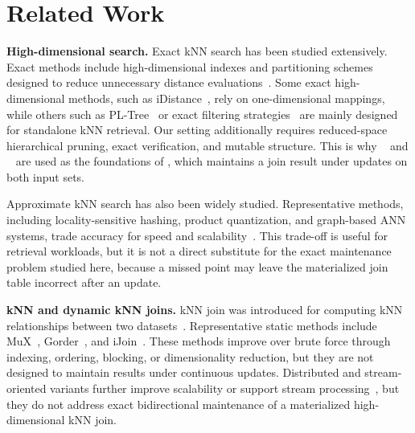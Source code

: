 \section{Related Work}\label{sec:related-works}

\noindent\textbf{High-dimensional search.}
Exact kNN search has been studied extensively. Exact methods include high-dimensional indexes and partitioning schemes designed to reduce unnecessary distance evaluations~\cite{yu2001indexing,cui2003contorting,cui2005indexing,garcia2010k,wang2013pl,xiao2016parallel,pan2020new,muhr2022hybrid}. Some exact high-dimensional methods, such as iDistance~\cite{jagadish2005idistance}, rely on one-dimensional mappings, while others such as PL-Tree~\cite{wang2013pl} or exact filtering strategies~\cite{pan2020new} are mainly designed for standalone kNN retrieval. Our setting additionally requires reduced-space hierarchical pruning, exact verification, and mutable structure. This is why \deltatree~\cite{cui2003contorting,cui2005indexing} and \hdrtree~\cite{yang2014continuous} are used as the foundations of \dualtree, which maintains a join result under updates on both input sets.

Approximate kNN search has also been widely studied. Representative methods, including locality-sensitive hashing, product quantization, and graph-based ANN systems, trade accuracy for speed and scalability~\cite{bawa2005lsh,jegou2010product,muja2014scalable,wang2019new,li2019approximate,song2020brepartition,gao2023high,zhao2023towards,chen2023finger}. This trade-off is useful for retrieval workloads, but it is not a direct substitute for the exact maintenance problem studied here, because a missed point may leave the materialized join table incorrect after an update.

\noindent\textbf{kNN and dynamic kNN joins.}
kNN join was introduced for computing kNN relationships between two datasets~\cite{bohm2003supporting,bohm2004k}. Representative static methods include MuX~\cite{bohm2001cost,bohm2004k}, Gorder~\cite{xia2004gorder}, and iJoin~\cite{yu2007efficient}. These methods improve over brute force through indexing, ordering, blocking, or dimensionality reduction, but they are not designed to maintain results under continuous updates. Distributed and stream-oriented variants further improve scalability or support stream processing~\cite{lu2012efficient,zhang2012efficient,zhao2017k,shahvarani2021distributed,bohm2006efficiently}, but they do not address exact bidirectional maintenance of a materialized high-dimensional kNN join.


